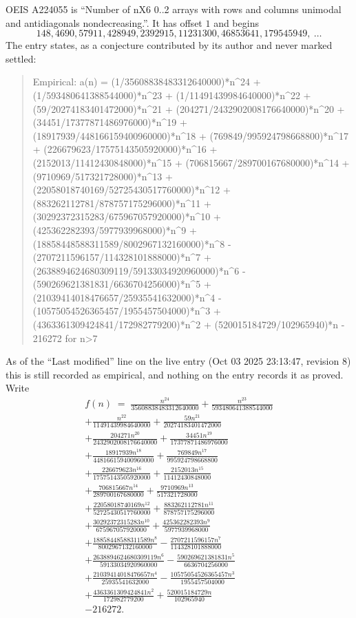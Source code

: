 \documentclass[11pt,a4paper]{article}
\theoremstyle{plain}
\theoremstyle{definition}
\begin{document}
OEIS A224055 is ``Number of nX6 0..2 arrays with rows and columns unimodal and antidiagonals nondecreasing.''. It has offset $1$ and begins
\[
148, 4690, 57911, 428949, 2392915, 11231300, 46853641, 179545949,\ \dots
\]
The entry states, as a conjecture contributed by its author and never marked settled:
\begin{quote}\raggedright\small
Empirical: a(n) = (1/35608838483312640000)*n\^{}24 + (1/593480641388544000)*n\^{}23 + (1/11491439984640000)*n\^{}22 + (59/20274183401472000)*n\^{}21 + (204271/2432902008176640000)*n\^{}20 + (34451/17377871486976000)*n\^{}19 + (18917939/448166159400960000)*n\^{}18 + (769849/995924798668800)*n\^{}17 + (226679623/17575143505920000)*n\^{}16 + (2152013/11412430848000)*n\^{}15 + (706815667/289700167680000)*n\^{}14 + (9710969/517321728000)*n\^{}13 + (22058018740169/52725430517760000)*n\^{}12 + (883262112781/878757175296000)*n\^{}11 + (30292372315283/675967057920000)*n\^{}10 + (425362282393/5977939968000)*n\^{}9 + (18858448588311589/8002967132160000)*n\^{}8 - (2707211596157/114328101888000)*n\^{}7 + (2638894624680309119/59133034920960000)*n\^{}6 - (590269621381831/6636704256000)*n\^{}5 + (21039414018476657/25935541632000)*n\^{}4 - (10575054526365457/1955457504000)*n\^{}3 + (4363361309424841/172982779200)*n\^{}2 + (520015184729/102965940)*n - 216272 for n>7
\end{quote}
As of the ``Last modified'' line on the live entry (Oct 03 2025 23:13:47, revision 8) this is still
recorded as empirical, and nothing on the entry records it as proved. Write
\begin{multline*}
f(n)\;=\;\frac{n^{24}}{35608838483312640000} + \frac{n^{23}}{593480641388544000} \\
+ \frac{n^{22}}{11491439984640000} + \frac{59 n^{21}}{20274183401472000} \\
+ \frac{204271 n^{20}}{2432902008176640000} + \frac{34451 n^{19}}{17377871486976000} \\
+ \frac{18917939 n^{18}}{448166159400960000} + \frac{769849 n^{17}}{995924798668800} \\
+ \frac{226679623 n^{16}}{17575143505920000} + \frac{2152013 n^{15}}{11412430848000} \\
+ \frac{706815667 n^{14}}{289700167680000} + \frac{9710969 n^{13}}{517321728000} \\
+ \frac{22058018740169 n^{12}}{52725430517760000} + \frac{883262112781 n^{11}}{878757175296000} \\
+ \frac{30292372315283 n^{10}}{675967057920000} + \frac{425362282393 n^{9}}{5977939968000} \\
+ \frac{18858448588311589 n^{8}}{8002967132160000} - \frac{2707211596157 n^{7}}{114328101888000} \\
+ \frac{2638894624680309119 n^{6}}{59133034920960000} - \frac{590269621381831 n^{5}}{6636704256000} \\
+ \frac{21039414018476657 n^{4}}{25935541632000} - \frac{10575054526365457 n^{3}}{1955457504000} \\
+ \frac{4363361309424841 n^{2}}{172982779200} + \frac{520015184729 n}{102965940} \\
- 216272.
\end{multline*}
\end{document}
